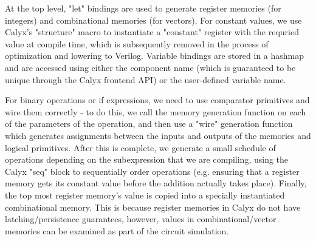 \documentclass[12pt]{article}
\begin{document}
At the top level, "let" bindings are used to generate register memories (for integers) and combinational memories
(for vectors). For constant values, we use Calyx's "structure" macro to instantiate a "constant" register with the
requried value at compile time, which is subsequently removed in the process of optimization and lowering to Verilog.
Variable bindings are stored in a hashmap and are accessed using either the component name (which is guaranteed
to be unique through the Calyx frontend API) or the user-defined variable name.

For binary operations or if expressions, we need to use comparator primitives and wire them correctly - to do this,
we call the memory generation function on each of the parameters of the operation, and then use a "wire"
generation function which generates assignments between the inputs and outputs of the memories and logical primitives.
After this is complete, we generate a small schedule of operations depending on the subexpression that we are compiling, using
the Calyx "seq" block to sequentially order operations (e.g. ensuring that a register memory gets its constant value
before the addition actually takes place). Finally, the top most register memory's value is copied into a specially
instantiated combinational memory. This is because register memories in Calyx do not have latching/persistence guarantees,
however, values in combinational/vector memories can be examined as part of the circuit simulation.
\end{document}
